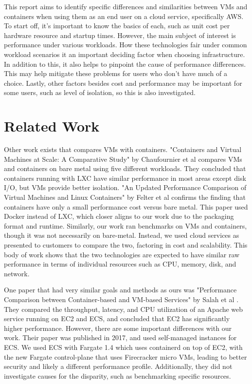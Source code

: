 \documentclass[11pt]{article}
\begin{document}
This report aims to identify specific differences and similarities between VMs and containers when using them as an end user on a cloud service, specifically AWS. To start off, it's important to know the basics of each, such as unit cost per hardware resource and startup times. However, the main subject of interest is performance under various workloads. How these technologies fair under common workload scenarios it an important deciding factor when choosing infrastructure. In addition to this, it also helps to pinpoint the cause of performance differences. This may help mitigate these problems for users who don't have much of a choice. Lastly, other factors besides cost and performance may be important for some users, such as level of isolation, so this is also investigated.
\vspace{3mm} %


\section{Related Work}

Other work exists that compares VMs with containers. "Containers and Virtual Machines at Scale: A Comparative Study" by Chaufournier et al \cite{10.1145/2988336.2988337} compares VMs and containers on bare metal using five different workloads. They concluded that containers running with LXC have similar performance in most areas except disk I/O, but VMs provide better isolation. "An Updated Performance Comparison of Virtual Machines and Linux Containers" by Felter et al \cite{7095802} confirms the finding that containers have only a small performance cost versus bare metal. This paper used Docker instead of LXC, which closer aligns to our work due to the packaging format and runtime. Similarly, our work ran benchmarks on VMs and containers, though it was not necessarily on bare-metal. Instead, we used cloud services as presented to customers to compare the two, factoring in cost and scalability. This body of work shows that the two technologies are expected to have similar raw performance in terms of individual resources such as CPU, memory, disk, and network.

One paper that had very similar goals and methods as ours was "Performance Comparison between Container-based and VM-based Services" by Salah et al \cite{7899408}. They compared the throughput, latency, and CPU utilization of an Apache web service running on EC2 and ECS, and concluded that EC2 has significantly higher performance. However, there are some important differences with our work. Their paper was published in 2017, and used self-managed instances for ECS. We used ECS with Fargate 1.4 which uses containerd on top of EC2, with the new Fargate control-plane that uses Firecracker micro VMs, leading to better security and likely a different performance profile. Additionally, they did not investigate causes for the disparity, such as benchmarking specific resources.
\end{document}
